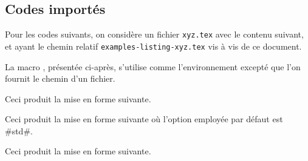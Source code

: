 \documentclass[10pt, a4paper]{article}
\begin{document}

\subsection{Codes importés}

Pour les codes suivants, on considère un fichier \verb+xyz.tex+ avec le contenu suivant, et ayant le chemin relatif \verb+examples-listing-xyz.tex+ vis à vis de ce document.


\medskip

La macro  , présentée ci-après, s'utilise comme l'environnement  excepté que l'on fournit le chemin d'un fichier.




\begin{bdocexa}
    \leavevmode

    \begin{bdoclatex}[code]
    \end{bdoclatex}

    Ceci produit la mise en forme suivante.

\end{bdocexa}




\begin{bdocexa}[À la suite]
    \leavevmode

    \begin{bdoclatex}[code]
    \end{bdoclatex}

    Ceci produit la mise en forme suivante où l'option employée par défaut est \bdocinlatex#std#.

\end{bdocexa}




\begin{bdocexa}
    \leavevmode

    \begin{bdoclatex}[code]
    \end{bdoclatex}

    Ceci produit la mise en forme suivante.

\end{bdocexa}
\end{document}
